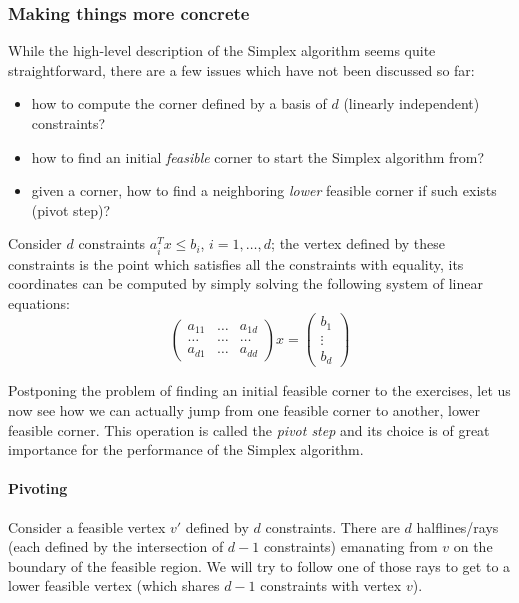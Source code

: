 \documentclass{article}
\newcommand{\mat}[1]{ \begin{pmatrix} #1 \end{pmatrix}}
\begin{document}
\subsubsection{Making things more concrete}
While the high-level description of the Simplex algorithm seems quite straightforward, there are a few issues which have not been discussed so far:
\begin{itemize}
\item how to compute the corner defined by a basis of $d$ (linearly independent) constraints?
\item how to find an initial \emph{feasible} corner to start the Simplex algorithm from?
\item given a corner, how to find a neighboring \emph{lower} feasible corner if such exists (pivot step)?
\end{itemize}

Consider $d$ constraints $a_i^T x \leq b_i$, $i=1,\dots, d$; the vertex defined by these constraints is the point which satisfies all the constraints with equality, its coordinates can be computed by simply solving the following system of linear equations:
\[
	\mat{a_{11} & \dots & a_{1d} \\ \dots & \dots & \dots \\ a_{d1} & \dots & a_{dd}} x 
		 = \mat{b_1\\ \vdots \\ b_d}
\]

Postponing the problem of finding an initial feasible corner to the exercises, let us now see how we can actually jump from one feasible corner to another, lower feasible corner. This operation is called the \emph{pivot step} and its choice is of great importance for the performance of the Simplex algorithm.

\paragraph*{Pivoting}
Consider a feasible vertex $v'$ defined by $d$ constraints. There are $d$ halflines/rays (each defined by the intersection of $d-1$ constraints) emanating from $v$ on the boundary of the feasible region. We will try to follow one of those rays to get to a lower feasible vertex (which shares $d-1$ constraints with vertex $v$).
\end{document}
